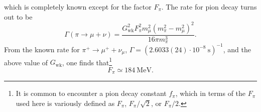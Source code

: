 which is completely known except for the factor $F_\pi$. The rate for pion decay turns out to be
\begin{equation}
\Gamma(\pi\to\mu+\nu)
=\frac{G_{\mathrm{wk}}^2F_\pi^2m_\mu^2
(m_\pi^2-m_\mu^2)^2}
{16\pi m_\pi^3}.
\tag{19.4.25}\label{eq:19.4.25}
\end{equation}
From the known rate for $\pi^+\to\mu^++\nu_\mu$, $\Gamma=(2.6033(24)\cdot10^{-8}\ \mathrm{s})^{-1}$, and the above value of $G_{\mathrm{wk}}$, one finds that\footnote{It is common to encounter a pion decay constant $f_\pi$, which in terms of the $F_\pi$ used here is variously defined as $F_\pi$, $F_\pi/\sqrt2$, or $F_\pi/2$.}
\begin{equation}
F_\pi\simeq184\ \mathrm{MeV}.
\tag{19.4.26}\label{eq:19.4.26}
\end{equation}

